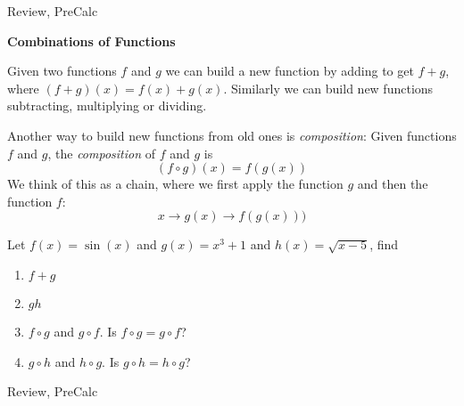 \begin{tagblock}{Review, PreCalc}
\begin{question}

\textbf{Combinations of Functions}


 Given two functions $f$ and $g$ we can build a new function by adding to get $f+g$, where $(f+g)(x) = f(x) + g(x)$.  Similarly we can build new functions subtracting, multiplying or dividing.  
 
 Another way to build new functions from old ones is \emph{composition}: Given functions $f$ and $g$, the \emph{composition} of $f$ and $g$ is
\[(f \circ g) (x) = f(g(x)) \]
We think of this as a chain, where we first apply the function $g$ and then the function $f$:
\[x \to g(x) \to f(g(x))) \]

\bigskip

Let $f(x) = \sin(x)$ and $g(x) = x^3+1$ and $h(x)=\sqrt{x-5}$, find
\begin{enumerate}
\item $f+g$
\item $gh$
\item $f \circ g$ and  $g \circ f$.   Is $f \circ g = g \circ f$?
\item $g \circ h$ and  $h \circ g$.  Is $g \circ h = h \circ g$?
\end{enumerate} 

	
 

\begin{tags}
	    Review, PreCalc
\end{tags}
	
\begin{diary}
	    
\end{diary}
	
\begin{solution}
		
\end{solution}
	
\end{question}

\end{tagblock}



